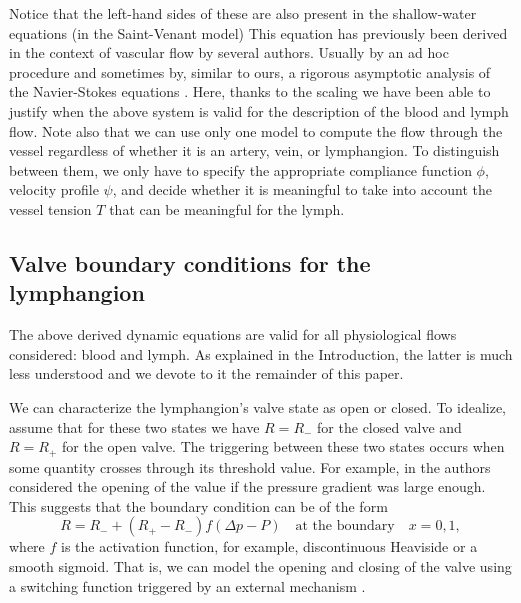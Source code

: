 \documentclass[12pt,a4paper]{article}
\begin{document}
Notice that the left-hand sides of these are also present in the shallow-water equations (in the Saint-Venant model) This equation has previously been derived in the context of vascular flow by several authors. Usually by an ad hoc procedure \cite{reddy1995mathematical} and sometimes by, similar to ours, a rigorous asymptotic analysis of the Navier-Stokes equations \cite{smith2002anatomically}. Here, thanks to the scaling we have been able to justify when the above system is valid for the description of the blood and lymph flow. Note also that we can use only one model to compute the flow through the vessel regardless of whether it is an artery, vein, or lymphangion. To distinguish between them, we only have to specify the appropriate compliance function $\phi$, velocity profile $\psi$, and decide whether it is meaningful to take into account the vessel tension $T$ that can be meaningful for the lymph.

\subsection{Valve boundary conditions for the lymphangion}
The above derived dynamic equations are valid for all physiological flows considered: blood and lymph. As explained in the Introduction, the latter is much less understood and we devote to it the remainder of this paper. 

We can characterize the lymphangion's valve state as open or closed. To idealize, assume that for these two states we have $R = R_-$ for the closed valve and $R = R_+$ for the open valve. The triggering between these two states occurs when some quantity crosses through its threshold value. For example, in \cite{bertram2011chain} the authors considered the opening of the value if the pressure gradient was large enough. This suggests that the boundary condition can be of the form
\begin{equation}\label{eqn:BoundaryConditionP}
    R = R_- + (R_+ - R_-)f(\Delta p - P) \quad \text{at the boundary} \quad x = 0,1,
\end{equation}
where $f$ is the activation function, for example, discontinuous Heaviside or a smooth sigmoid. That is, we can model the opening and closing of the valve using a switching function triggered by an external mechanism \cite{contarino2018one}.
\end{document}
